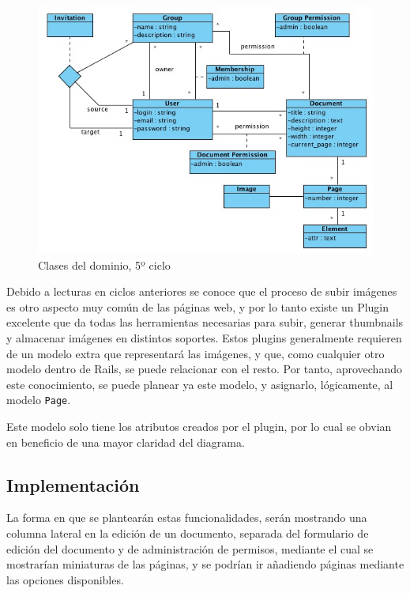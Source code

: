 \begin{figure}[h!]
\centering
\includegraphics[width=14cm]{uml5.png}
\caption{Clases del dominio, 5º ciclo}\label{fig:uml5}
\end{figure}

Debido a lecturas en ciclos anteriores se conoce que el proceso de subir imágenes es otro aspecto muy común de las páginas web, y por lo tanto existe un Plugin excelente que da todas las herramientas necesarias para subir, generar thumbnails y almacenar imágenes en distintos soportes. Estos plugins generalmente requieren de un modelo extra que representará las imágenes, y que, como cualquier otro modelo dentro de Rails, se puede relacionar con el resto. Por tanto, aprovechando este conocimiento, se puede planear ya este modelo, y asignarlo, lógicamente, al modelo \texttt{Page}.

Este modelo solo tiene los atributos creados por el plugin, por lo cual se obvian en beneficio de una mayor claridad del diagrama.


\subsection{Implementación} %
\label{sub:implementación}

La forma en que se plantearán estas funcionalidades, serán mostrando una columna lateral en la edición de un documento, separada del formulario de edición del documento y de administración de permisos, mediante el cual se mostrarían miniaturas de las páginas, y se podrían ir añadiendo páginas mediante las opciones disponibles. 

